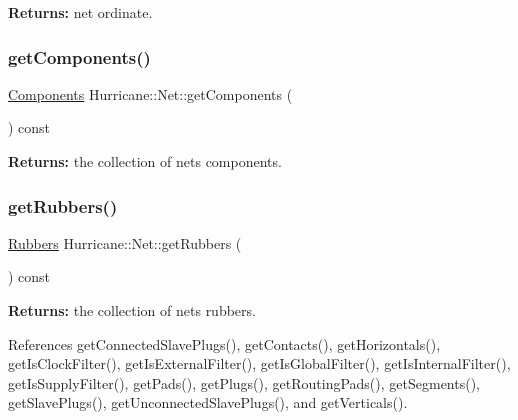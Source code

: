 {\bfseries Returns\+:} net ordinate. \mbox{\label{classHurricane_1_1Net_a1e2d7ef9bab15694870a605e514f26e8}} 
\subsubsection{\texorpdfstring{get\+Components()}{getComponents()}}
{\footnotesize\ttfamily \hyperlink{namespaceHurricane_a7d26d99aeb5dd6d70d51bd35d2473e72}{Components} Hurricane\+::\+Net\+::get\+Components (\begin{DoxyParamCaption}{ }\end{DoxyParamCaption}) const\hspace{0.3cm}{\ttfamily [inline]}}

{\bfseries Returns\+:} the collection of net\textquotesingle{}s components. \mbox{\label{classHurricane_1_1Net_a6ddbe2697a7fd7a7cd359f97b2ad0223}} 
\subsubsection{\texorpdfstring{get\+Rubbers()}{getRubbers()}}
{\footnotesize\ttfamily \hyperlink{namespaceHurricane_af8923abd57508cc44931a00d61b564ad}{Rubbers} Hurricane\+::\+Net\+::get\+Rubbers (\begin{DoxyParamCaption}{ }\end{DoxyParamCaption}) const\hspace{0.3cm}{\ttfamily [inline]}}

{\bfseries Returns\+:} the collection of net\textquotesingle{}s rubbers. 

References get\+Connected\+Slave\+Plugs(), get\+Contacts(), get\+Horizontals(), get\+Is\+Clock\+Filter(), get\+Is\+External\+Filter(), get\+Is\+Global\+Filter(), get\+Is\+Internal\+Filter(), get\+Is\+Supply\+Filter(), get\+Pads(), get\+Plugs(), get\+Routing\+Pads(), get\+Segments(), get\+Slave\+Plugs(), get\+Unconnected\+Slave\+Plugs(), and get\+Verticals().

\mbox{\label{classHurricane_1_1Net_a1078d55acf3efa0b3c23cd345cae87fa}} 
